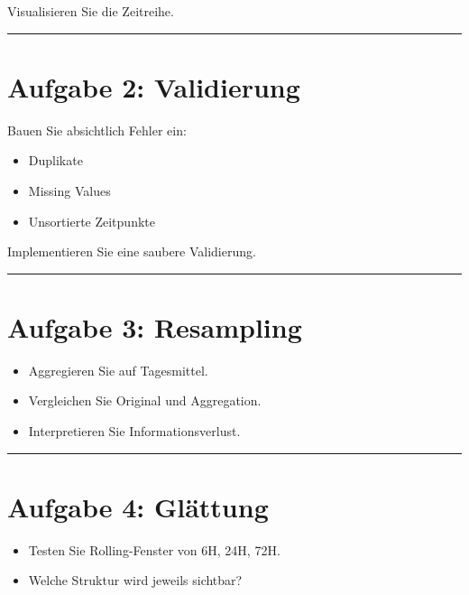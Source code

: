 \documentclass[
  ngerman,
  letterpaper,
  DIV=11]{scrreprt}
\providecommand{\tightlist}{%
  \setlength{\itemsep}{0pt}\setlength{\parskip}{0pt}}
\begin{document}
Visualisieren Sie die Zeitreihe.

\begin{center}\rule{0.5\linewidth}{0.5pt}\end{center}

\section{Aufgabe 2: Validierung}\label{aufgabe-2-validierung}

Bauen Sie absichtlich Fehler ein:

\begin{itemize}
\tightlist
\item
  Duplikate
\item
  Missing Values
\item
  Unsortierte Zeitpunkte
\end{itemize}

Implementieren Sie eine saubere Validierung.

\begin{center}\rule{0.5\linewidth}{0.5pt}\end{center}

\section{Aufgabe 3: Resampling}\label{aufgabe-3-resampling}

\begin{itemize}
\tightlist
\item
  Aggregieren Sie auf Tagesmittel.
\item
  Vergleichen Sie Original und Aggregation.
\item
  Interpretieren Sie Informationsverlust.
\end{itemize}

\begin{center}\rule{0.5\linewidth}{0.5pt}\end{center}

\section{Aufgabe 4: Glättung}\label{aufgabe-4-gluxe4ttung}

\begin{itemize}
\tightlist
\item
  Testen Sie Rolling-Fenster von 6H, 24H, 72H.
\item
  Welche Struktur wird jeweils sichtbar?
\end{itemize}
\end{document}
